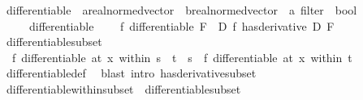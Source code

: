 \begin{isabellebody}
\endisatagproof
{\isafoldproof}%
%
\isadelimproof
%
\endisadelimproof
%
\isadelimdocument
%
\endisadelimdocument
%
\isatagdocument
%
\isamarkuptrue%
%
\endisatagdocument
{\isafolddocument}%
%
\isadelimdocument
%
\endisadelimdocument
{}\isamarkupfalse%
\ differentiable\ {\isacharcolon}{\kern0pt}{\isacharcolon}{\kern0pt}\ {\isachardoublequoteopen}{\isacharparenleft}{\kern0pt}{\isacharprime}{\kern0pt}a{\isacharcolon}{\kern0pt}{\isacharcolon}{\kern0pt}real{\isacharunderscore}{\kern0pt}normed{\isacharunderscore}{\kern0pt}vector\ {\isasymRightarrow}\ {\isacharprime}{\kern0pt}b{\isacharcolon}{\kern0pt}{\isacharcolon}{\kern0pt}real{\isacharunderscore}{\kern0pt}normed{\isacharunderscore}{\kern0pt}vector{\isacharparenright}{\kern0pt}\ {\isasymRightarrow}\ {\isacharprime}{\kern0pt}a\ filter\ {\isasymRightarrow}\ bool{\isachardoublequoteclose}\isanewline
\ \ \ \ {\isacharparenleft}{\kern0pt}\ {\isachardoublequoteopen}differentiable{\isachardoublequoteclose}\ {}{}{\isacharparenright}{\kern0pt}\isanewline
\ \ \ {\isachardoublequoteopen}f\ differentiable\ F\ {\isasymlongleftrightarrow}\ {\isacharparenleft}{\kern0pt}{\isasymexists}D{\isachardot}{\kern0pt}\ {\isacharparenleft}{\kern0pt}f\ has{\isacharunderscore}{\kern0pt}derivative\ D{\isacharparenright}{\kern0pt}\ F{\isacharparenright}{\kern0pt}{\isachardoublequoteclose}\isanewline
\isanewline
{}\isamarkupfalse%
\ differentiable{\isacharunderscore}{\kern0pt}subset{\isacharcolon}{\kern0pt}\isanewline
\ \ {\isachardoublequoteopen}f\ differentiable\ {\isacharparenleft}{\kern0pt}at\ x\ within\ s{\isacharparenright}{\kern0pt}\ {\isasymLongrightarrow}\ t\ {\isasymsubseteq}\ s\ {\isasymLongrightarrow}\ f\ differentiable\ {\isacharparenleft}{\kern0pt}at\ x\ within\ t{\isacharparenright}{\kern0pt}{\isachardoublequoteclose}\isanewline
%
\isadelimproof
\ \ %
\endisadelimproof
%
\isatagproof
{}\isamarkupfalse%
\ differentiable{\isacharunderscore}{\kern0pt}def\ \isamarkupfalse%
\ {\isacharparenleft}{\kern0pt}blast\ intro{\isacharcolon}{\kern0pt}\ has{\isacharunderscore}{\kern0pt}derivative{\isacharunderscore}{\kern0pt}subset{\isacharparenright}{\kern0pt}%
\endisatagproof
{\isafoldproof}%
%
\isadelimproof
\isanewline
%
\endisadelimproof
\isanewline
{}\isamarkupfalse%
\ differentiable{\isacharunderscore}{\kern0pt}within{\isacharunderscore}{\kern0pt}subset\ {\isacharequal}{\kern0pt}\ differentiable{\isacharunderscore}{\kern0pt}subset\isanewline

\end{isabellebody}
